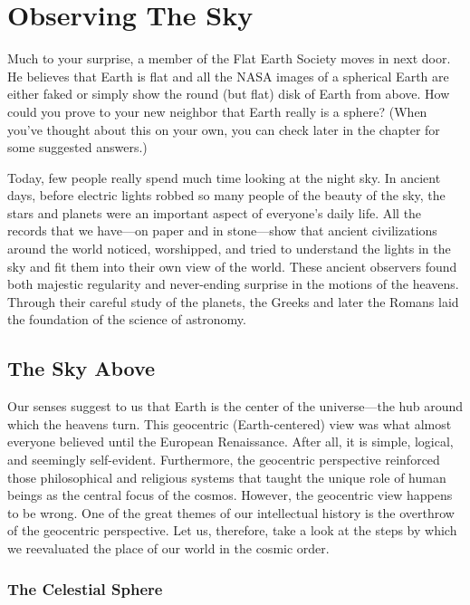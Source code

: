 \documentclass[main.tex]{subfiles}
\begin{document}
\section{Observing The Sky}

Much to your surprise, a member of the Flat Earth Society moves in next door. He believes that Earth is flat and all the NASA images of a spherical Earth are either faked or simply show the round (but flat) disk of Earth from above. How could you prove to your new neighbor that Earth really is a sphere? (When you've thought about this on your own, you can check later in the chapter for some suggested answers.)

\vspace{1em}

Today, few people really spend much time looking at the night sky. In ancient days, before electric lights robbed so many people of the beauty of the sky, the stars and planets were an important aspect of everyone's daily life. All the records that we have---on paper and in stone---show that ancient civilizations around the world noticed, worshipped, and tried to understand the lights in the sky and fit them into their own view of the world. These ancient observers found both majestic regularity and never-ending surprise in the motions of the heavens. Through their careful study of the planets, the Greeks and later the Romans laid the foundation of the science of astronomy.

\subsection{The Sky Above}

Our senses suggest to us that Earth is the center of the universe---the hub around which the heavens turn. This \gls{geocentric} (Earth-centered) view was what almost everyone believed until the European Renaissance. After all, it is simple, logical, and seemingly self-evident. Furthermore, the geocentric perspective reinforced those philosophical and religious systems that taught the unique role of human beings as the central focus of the cosmos. However, the geocentric view happens to be wrong. One of the great themes of our intellectual history is the overthrow of the geocentric perspective. Let us, therefore, take a look at the steps by which we reevaluated the place of our world in the cosmic order.

\subsubsection*{The Celestial Sphere}
\end{document}
